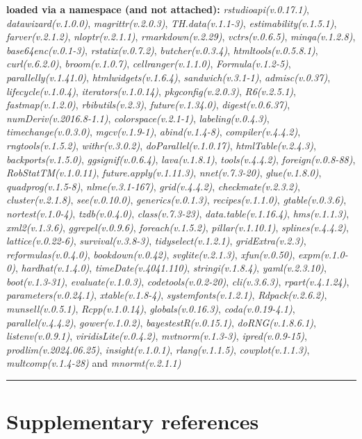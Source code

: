 \documentclass[
  bookmarksnumbered]{article}
\begin{document}
\textbf{loaded via a namespace (and not attached):}
\emph{rstudioapi(v.0.17.1)}, \emph{datawizard(v.1.0.0)}, \emph{magrittr(v.2.0.3)}, \emph{TH.data(v.1.1-3)}, \emph{estimability(v.1.5.1)}, \emph{farver(v.2.1.2)}, \emph{nloptr(v.2.1.1)}, \emph{rmarkdown(v.2.29)}, \emph{vctrs(v.0.6.5)}, \emph{minqa(v.1.2.8)}, \emph{base64enc(v.0.1-3)}, \emph{rstatix(v.0.7.2)}, \emph{butcher(v.0.3.4)}, \emph{htmltools(v.0.5.8.1)}, \emph{curl(v.6.2.0)}, \emph{broom(v.1.0.7)}, \emph{cellranger(v.1.1.0)}, \emph{Formula(v.1.2-5)}, \emph{parallelly(v.1.41.0)}, \emph{htmlwidgets(v.1.6.4)}, \emph{sandwich(v.3.1-1)}, \emph{admisc(v.0.37)}, \emph{lifecycle(v.1.0.4)}, \emph{iterators(v.1.0.14)}, \emph{pkgconfig(v.2.0.3)}, \emph{R6(v.2.5.1)}, \emph{fastmap(v.1.2.0)}, \emph{rbibutils(v.2.3)}, \emph{future(v.1.34.0)}, \emph{digest(v.0.6.37)}, \emph{numDeriv(v.2016.8-1.1)}, \emph{colorspace(v.2.1-1)}, \emph{labeling(v.0.4.3)}, \emph{timechange(v.0.3.0)}, \emph{mgcv(v.1.9-1)}, \emph{abind(v.1.4-8)}, \emph{compiler(v.4.4.2)}, \emph{rngtools(v.1.5.2)}, \emph{withr(v.3.0.2)}, \emph{doParallel(v.1.0.17)}, \emph{htmlTable(v.2.4.3)}, \emph{backports(v.1.5.0)}, \emph{ggsignif(v.0.6.4)}, \emph{lava(v.1.8.1)}, \emph{tools(v.4.4.2)}, \emph{foreign(v.0.8-88)}, \emph{RobStatTM(v.1.0.11)}, \emph{future.apply(v.1.11.3)}, \emph{nnet(v.7.3-20)}, \emph{glue(v.1.8.0)}, \emph{quadprog(v.1.5-8)}, \emph{nlme(v.3.1-167)}, \emph{grid(v.4.4.2)}, \emph{checkmate(v.2.3.2)}, \emph{cluster(v.2.1.8)}, \emph{see(v.0.10.0)}, \emph{generics(v.0.1.3)}, \emph{recipes(v.1.1.0)}, \emph{gtable(v.0.3.6)}, \emph{nortest(v.1.0-4)}, \emph{tzdb(v.0.4.0)}, \emph{class(v.7.3-23)}, \emph{data.table(v.1.16.4)}, \emph{hms(v.1.1.3)}, \emph{xml2(v.1.3.6)}, \emph{ggrepel(v.0.9.6)}, \emph{foreach(v.1.5.2)}, \emph{pillar(v.1.10.1)}, \emph{splines(v.4.4.2)}, \emph{lattice(v.0.22-6)}, \emph{survival(v.3.8-3)}, \emph{tidyselect(v.1.2.1)}, \emph{gridExtra(v.2.3)}, \emph{reformulas(v.0.4.0)}, \emph{bookdown(v.0.42)}, \emph{svglite(v.2.1.3)}, \emph{xfun(v.0.50)}, \emph{expm(v.1.0-0)}, \emph{hardhat(v.1.4.0)}, \emph{timeDate(v.4041.110)}, \emph{stringi(v.1.8.4)}, \emph{yaml(v.2.3.10)}, \emph{boot(v.1.3-31)}, \emph{evaluate(v.1.0.3)}, \emph{codetools(v.0.2-20)}, \emph{cli(v.3.6.3)}, \emph{rpart(v.4.1.24)}, \emph{parameters(v.0.24.1)}, \emph{xtable(v.1.8-4)}, \emph{systemfonts(v.1.2.1)}, \emph{Rdpack(v.2.6.2)}, \emph{munsell(v.0.5.1)}, \emph{Rcpp(v.1.0.14)}, \emph{globals(v.0.16.3)}, \emph{coda(v.0.19-4.1)}, \emph{parallel(v.4.4.2)}, \emph{gower(v.1.0.2)}, \emph{bayestestR(v.0.15.1)}, \emph{doRNG(v.1.8.6.1)}, \emph{listenv(v.0.9.1)}, \emph{viridisLite(v.0.4.2)}, \emph{mvtnorm(v.1.3-3)}, \emph{ipred(v.0.9-15)}, \emph{prodlim(v.2024.06.25)}, \emph{insight(v.1.0.1)}, \emph{rlang(v.1.1.5)}, \emph{cowplot(v.1.1.3)}, \emph{multcomp(v.1.4-28)} and \emph{mnormt(v.2.1.1)}

\begin{center}\rule{0.5\linewidth}{0.5pt}\end{center}

\section{Supplementary references}\label{refs}

\begin{multicols}{2}
\AtNextBibliography{\footnotesize}
\printbibliography[heading=none]
\normalsize
\end{multicols}

\def\printbibliography{}

\printbibliography
\end{document}
